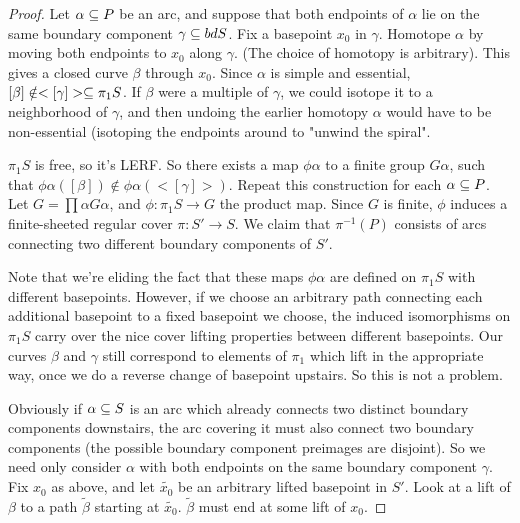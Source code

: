 \begin{proof}

Let $\alpha \subseteq P$ be an arc, and suppose that both endpoints of $\alpha$ lie
on the same boundary component $\gamma \subseteq bd S$. Fix a basepoint $x_0$ in
$\gamma$.  Homotope $\alpha$ by moving both endpoints to $x_0$ along $\gamma$.
(The choice of homotopy is arbitrary). This gives a closed curve $\beta$
through $x_0$. Since $\alpha$ is simple and essential, $[\beta] \notin
<[\gamma]> \subseteq \pi_1S$. If $\beta$ were a multiple of $\gamma$, we could
isotope it to a neighborhood of $\gamma$, and then undoing the earlier homotopy
$\alpha$ would have to be non-essential (isotoping the endpoints around to
"unwind the spiral".

$\pi_1S$ is free, so it's LERF. So there exists a map $\phi\alpha$ to a finite
group $G\alpha$, such that $\phi\alpha([\beta]) \notin \phi\alpha(<[\gamma]>)$.
Repeat this construction for each $\alpha \subseteq P$. Let $G = \prod \alpha
G\alpha$, and $\phi \colon\pi_1S \to G$ the product map. Since $G$ is finite,
$\phi$ induces a finite-sheeted regular cover $\pi \colon S' \to S$. We claim
that $\pi^{-1}(P)$ consists of arcs connecting two different boundary
components of $S'$.

Note that we're eliding the fact that these maps $\phi\alpha$ are defined on
$\pi_1S$ with different basepoints. However, if we choose an arbitrary path
connecting each additional basepoint to a fixed basepoint we choose, the
induced isomorphisms on $\pi_1S$ carry over the nice cover lifting properties
between different basepoints. Our curves $\beta$ and $\gamma$ still correspond
to elements of $\pi_1$ which lift in the appropriate way, once we do a reverse
change of basepoint upstairs. So this is not a problem.

Obviously if $\alpha \subseteq S$ is an arc which already connects two distinct
boundary components downstairs, the arc covering it must also connect two
boundary components (the possible boundary component preimages are disjoint).
So we need only consider $\alpha$ with both endpoints on the same boundary
component $\gamma$.  Fix $x_0$ as above, and let $\widetilde{x_0}$ be an
arbitrary lifted basepoint in $S'$.  Look at a lift of $\beta$ to a path
$\widetilde{\beta}$ starting at $\widetilde{x_0}$. $\widetilde{\beta}$ must end at some lift
of $x_0$.


\end{proof}

